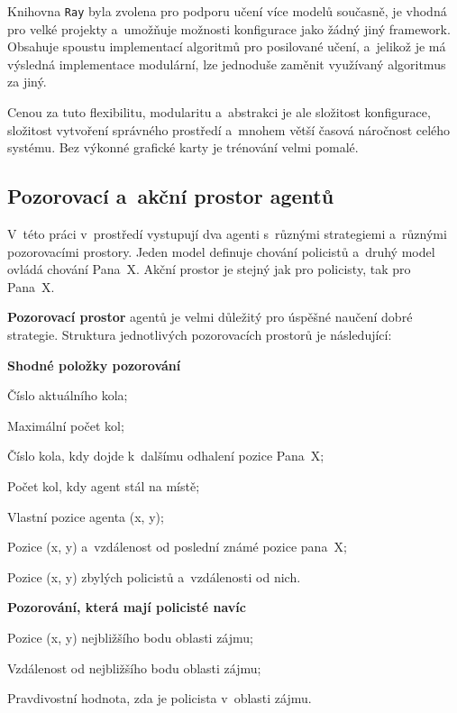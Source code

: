 Knihovna \texttt{Ray} byla zvolena pro podporu učení více modelů současně, je vhodná pro velké projekty a~umožňuje možnosti konfigurace jako žádný jiný framework.
Obsahuje spoustu implementací algoritmů pro posilované učení, a~jelikož je má výsledná implementace modulární, lze jednoduše zaměnit využívaný algoritmus za jiný.

Cenou za tuto flexibilitu, modularitu a~abstrakci je ale složitost konfigurace, složitost vytvoření správného prostředí a~mnohem větší časová náročnost celého systému.
Bez výkonné grafické karty je trénování velmi pomalé.

\subsection{Pozorovací a~akční prostor agentů}
V~této práci v~prostředí vystupují dva agenti s~různými strategiemi a~různými pozorovacími prostory.
Jeden model definuje chování policistů a~druhý model ovládá chování Pana~X\@.
Akční prostor je stejný jak pro policisty, tak pro Pana~X\@.

\bigskip
\textbf{Pozorovací prostor} agentů je velmi důležitý pro úspěšné naučení dobré strategie.
Struktura jednotlivých pozorovacích prostorů je následující:

\begin{myitemize}
  \item \textbf{Shodné položky pozorování}
  \begin{myitemize}
    \item Číslo aktuálního kola;
    \item Maximální počet kol;
    \item Číslo kola, kdy dojde k~dalšímu odhalení pozice Pana~X;
    \item Počet kol, kdy agent stál na místě;
    \item Vlastní pozice agenta (x, y);
    \item Pozice (x, y) a~vzdálenost od poslední známé pozice pana~X;
    \item Pozice (x, y) zbylých policistů a~vzdálenosti od nich.
  \end{myitemize}
  \item \textbf{Pozorování, která mají policisté navíc}
    \begin{myitemize}
    \item Pozice (x, y) nejbližšího bodu oblasti zájmu;
    \item Vzdálenost od nejbližšího bodu oblasti zájmu;
    \item Pravdivostní hodnota, zda je policista v~oblasti zájmu.
  \end{myitemize}
\end{myitemize}


